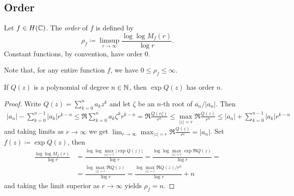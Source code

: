 \subsection{Order}

\begin{definition} \label{def:order}
    Let $f \in H(\mathbb{C})$. The \emph{order} of $f$ is defined by
    \begin{equation} \label{eq:def-order}
        \rho_f \coloneqq \limsup_{r \to \infty} \frac{\log \log M_f(r)}{\log r}.
    \end{equation}
    Constant functions, by convention, have order 0.
\end{definition}

Note that, for any entire function $f$, we have $0 \leq \rho_f \leq \infty$.

\begin{proposition} \label{prop:order-exponential-polynomial}
    If $Q(z)$ is a polynomial of degree $n \in \mathbb{N}$, then $\exp Q(z)$ has order $n$.
\end{proposition}

\begin{proof}
    Write $Q(z) = \sum_{k=0}^n a_k z^k$ and let $\zeta$ be an $n$-th root of $\overline{a_n} / \vert a_n \vert$. Then
    \begin{align*}
        \vert a_n \vert - \sum_{k=0}^{n-1} \vert a_k \vert r^{k-n} \leq \Re \sum_{k=0}^{n} a_k \zeta^k r^{k-n} = \Re \frac{Q(r \zeta)}{r^n} \leq \max_{\vert z \vert = r} \Re \frac{Q(z)}{r^n} \leq \vert a_n \vert + \sum_{k=0}^{n-1} \vert a_k \vert r^{k-n}
    \end{align*}
    and taking limits as $r \to \infty$ we get $\lim_{r \to \infty} \max_{\vert z \vert = r} \Re \frac{Q(z)}{r^n} = \vert a_n \vert$. Set $f(z) \coloneqq \exp Q(z)$, then
    \begin{align*}
        \frac{\log \log M_f(r)}{\log r} &= \frac{\log \log \max_{\vert z \vert = r} \vert \exp Q(z) \vert}{\log r} = \frac{\log \log \max_{\vert z \vert = r} \exp \Re Q(z)}{\log r} = \\
        &= \frac{\log \max_{\vert z \vert = r} \Re Q(z)}{\log r} = \frac{\log \max_{\vert z \vert = r} \Re Q(z) / r^n}{\log r} + n
    \end{align*}
    and taking the limit superior as $r \to \infty$ yields $\rho_f = n$.
\end{proof}


